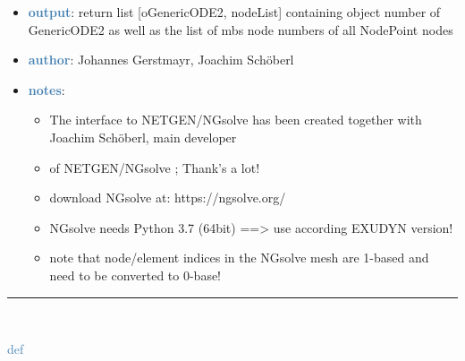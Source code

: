 \begin{itemize}[leftmargin=1.4cm]
\begin{itemize}[leftmargin=1.4cm]
\begin{itemize}[leftmargin=1.4cm]
\begin{itemize}[leftmargin=0.5cm]
\begin{itemize}[leftmargin=1.4cm]
\begin{itemize}[leftmargin=1.4cm]
\begin{itemize}[leftmargin=1.4cm]
\begin{itemize}[leftmargin=0.5cm]
\begin{itemize}[leftmargin=0.7cm]
\begin{itemize}[leftmargin=1.2cm]
\setlength{\itemindent}{-0.7cm}
\item[]{\it mbs}: multibody system to which the GenericODE2 is added
\item[]{\it mesh}: a previously created \texttt{ngs.mesh} (NGsolve mesh, see examples)
\item[]{\it youngsModulus}: Young's modulus used for mechanical model
\item[]{\it poissonsRatio}: Poisson's ratio used for mechanical model
\item[]{\it density}: density used for mechanical model
\item[]{\it meshOrder}: use 1 for linear elements and 2 for second order elements (recommended to use 2 for much higher accuracy!)
\end{itemize}
\item[--]\textcolor{steelblue}{\bf output}: return list [oGenericODE2, nodeList] containing object number of GenericODE2 as well as the list of mbs node numbers of all NodePoint nodes
\item[--]\textcolor{steelblue}{\bf author}: Johannes Gerstmayr, Joachim Schöberl
\item[--]\textcolor{steelblue}{\bf notes}: \vspace{-6pt}
\begin{itemize}[leftmargin=1.2cm]
\setlength{\itemindent}{-0.7cm}
\item[]The interface to NETGEN/NGsolve has been created together with Joachim Schöberl, main developer
\item[]of NETGEN/NGsolve \cite{Schoeberl1997,NGsolve2014}; Thank's a lot!
\item[]download NGsolve at: https://ngsolve.org/
\item[]NGsolve needs Python 3.7 (64bit) ==> use according EXUDYN version!
\item[]note that node/element indices in the NGsolve mesh are 1-based and need to be converted to 0-base!
\end{itemize}
\vspace{12pt}\end{itemize}
%
\noindent\rule{8cm}{0.75pt}\vspace{1pt} \\ 
\begin{flushleft}
\noindent \textcolor{steelblue}{def {\bf {}}}\label{sec:FEM:FEMinterface:ComputeEigenmodes}

\end{flushleft}
\end{itemize}
\end{itemize}
\end{itemize}
\end{itemize}
\end{itemize}
\end{itemize}
\end{itemize}
\end{itemize}
